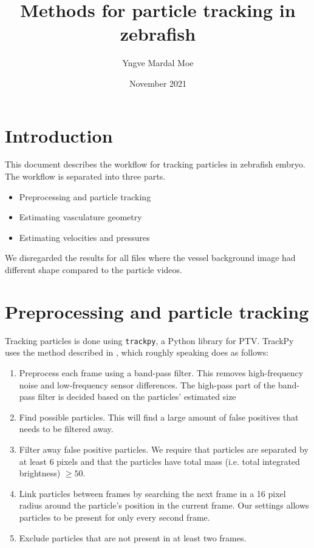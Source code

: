 \documentclass{article}
\title{Methods for particle tracking in zebrafish}
\author{Yngve Mardal Moe}
\date{November 2021}
\begin{document}
\maketitle

\section{Introduction}
This document describes the workflow for tracking particles in zebrafish embryo. The workflow is separated into three parts.

\begin{itemize}
    \item Preprocessing and particle tracking
    \item Estimating vasculature geometry
    \item Estimating velocities and pressures
\end{itemize}

We disregarded the results for all files where the vessel background image had different shape compared to the particle videos.

\section{Preprocessing and particle tracking}
Tracking particles is done using \texttt{trackpy}, a Python library for PTV. TrackPy uses the method described in \cite{crocker1996methods}, which roughly speaking does as follows:

\begin{enumerate}
    \item Preprocess each frame using a band-pass filter. This removes high-frequency noise and low-frequency sensor differences. The high-pass part of the band-pass filter is decided based on the particles' estimated size
    \item Find possible particles. This will find a large amount of false positives that needs to be filtered away.
    \item Filter away false positive particles. We require that particles are separated by at least 6 pixels and that the particles have total mass (i.e. total integrated brightness) $\geq 50$.
    \item Link particles between frames by searching the next frame in a 16 pixel radius around the particle's position in the current frame. Our settings allows particles to be present for only every second frame.
    \item Exclude particles that are not present in at least two frames.
\end{enumerate}
\end{document}
